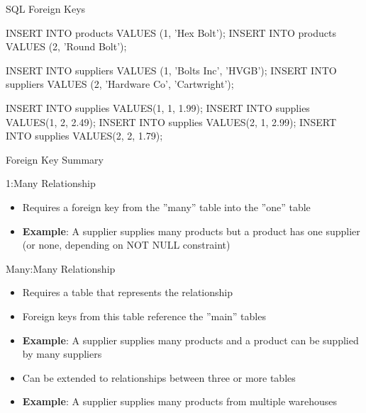 \documentclass[ignorenonframetext,xcolor=x11names]{beamer}
\begin{document}
\begin{frame}[label=full,fragile]{SQL Foreign Keys}
\footnotesize
\begin{sqlcode}
INSERT INTO products VALUES (1, 'Hex Bolt');
INSERT INTO products VALUES (2, 'Round Bolt');

INSERT INTO suppliers VALUES (1, 'Bolts Inc', 'HVGB');
INSERT INTO suppliers 
    VALUES (2, 'Hardware Co', 'Cartwright');

INSERT INTO supplies VALUES(1, 1, 1.99);
INSERT INTO supplies VALUES(1, 2, 2.49);
INSERT INTO supplies VALUES(2, 1, 2.99);
INSERT INTO supplies VALUES(2, 2, 1.79);
\end{sqlcode}
\end{frame}

\begin{frame}[label=full]{Foreign Key Summary}
\small
\begin{block}{1:Many Relationship}
\begin{itemize}
  \item Requires a foreign key from the ''many'' table into the ''one'' table
  \item \textbf{Example}: A supplier supplies many products but a product has one supplier (or none, depending on NOT NULL constraint)
\end{itemize}
\end{block}
\begin{block}{Many:Many Relationship}
\begin{itemize}
  \item Requires a table that represents the relationship
  \item Foreign keys from this table reference the ''main'' tables
  \item \textbf{Example}: A supplier supplies many products and a product can be supplied by many suppliers
  \item Can be extended to relationships between three or more tables
  \item \textbf{Example}: A supplier supplies many products from multiple warehouses
\end{itemize}
\end{block}
\end{frame}
\end{document}
